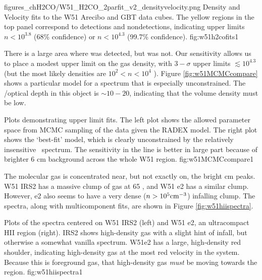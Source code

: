 {figures_chH2CO/W51_H2CO_2parfit_v2_densityvelocity.png}
{Density and Velocity fits to the W51 Arecibo and GBT \formaldehyde 
data cubes.  The yellow regions in the top panel correspond to \oneone
detections and \twotwo nondetections, indicating upper limits $n<10^{3.8}$
(68\% confidence) or $n<10^{4.3}$ (99.7\% confidence).}
{fig:w51h2cofits}{1}

There is a large area where \oneone was detected, but \twotwo was not.  Our
sensitivity allows us to place a modest upper limit on the gas density, with
$3-\sigma$ upper limits $\lesssim10^{4.3}$ \percc (but the most likely
densities are $10^2 < n < 10^4$ \percc).  Figure \ref{fig:w51MCMCcompare} shows
a particular model for a spectrum that is especially unconstrained.  The
\oneone/\twotwo optical depth in this object is $\sim10-20$, indicating that
the volume density must be low.

{Plots demonstrating upper limit fits.  The left plot shows the allowed
parameter space from MCMC sampling of the data given the RADEX model.  The
right plot shows the `best-fit' model, which is clearly unconstrained by the
relatively insensitive \twotwo\ spectrum.  The sensitivity in the \oneone line
is better in large part because of brighter 6 cm background across the
whole W51 region. }
{fig:w51MCMCcompare}{1}

The molecular gas is concentrated near, but not exactly on, the bright cm
peaks.  W51 IRS2 has a massive clump of gas at 65 \kms, and W51 e2 has a
similar clump.  However, e2 also seems to have a very dense ($n>10^5 \textrm{cm}^{-3}$)
infalling clump.  The spectra, along with multicomponent fits, are shown in
Figure \ref{fig:w51hiispectra}.

{Plots of the spectra centered on W51 IRS2 (left) and W51 e2, an ultracompact HII region (right). 
IRS2 shows high-density gas with a slight hint of infall, but otherwise a somewhat vanilla spectrum.
W51e2 has a large, high-density red shoulder, indicating high-density gas at the most red velocity in the system.
Because this is foreground gas, that high-density gas \emph{must} be moving towards the \uchii region.}
{fig:w51hiispectra}{1}




